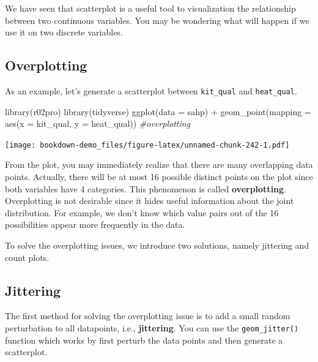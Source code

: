 \documentclass[
]{book}
\newenvironment{Shaded}{\begin{snugshade}}{\end{snugshade}}
\newcommand{\AttributeTok}[1]{\textcolor[rgb]{0.77,0.63,0.00}{#1}}
\newcommand{\CommentTok}[1]{\textcolor[rgb]{0.56,0.35,0.01}{\textit{#1}}}
\newcommand{\FunctionTok}[1]{\textcolor[rgb]{0.00,0.00,0.00}{#1}}
\newcommand{\NormalTok}[1]{#1}
\newcommand{\SpecialCharTok}[1]{\textcolor[rgb]{0.00,0.00,0.00}{#1}}
\begin{document}
We have seen that scatterplot is a useful tool to visualization the relationship between two continuous variables. You may be wondering what will happen if we use it on two discrete variables.

\hypertarget{overplotting}{%
\subsection{Overplotting}\label{overplotting}}

As an example, let's generate a scatterplot between \texttt{kit\_qual} and \texttt{heat\_qual}.

\begin{Shaded}
\begin{Highlighting}[]
\FunctionTok{library}\NormalTok{(r02pro)}
\FunctionTok{library}\NormalTok{(tidyverse)}
\FunctionTok{ggplot}\NormalTok{(}\AttributeTok{data =}\NormalTok{ sahp) }\SpecialCharTok{+} \FunctionTok{geom\_point}\NormalTok{(}\AttributeTok{mapping =} \FunctionTok{aes}\NormalTok{(}\AttributeTok{x =}\NormalTok{ kit\_qual, }\AttributeTok{y =}\NormalTok{ heat\_qual)) }\CommentTok{\#overplotting}
\end{Highlighting}
\end{Shaded}

\texttt{[image: bookdown-demo\_files/figure-latex/unnamed-chunk-242-1.pdf]}

From the plot, you may immediately realize that there are many overlapping data points. Actually, there will be at most 16 possible distinct points on the plot since both variables have 4 categories. This phenomenon is called \textbf{overplotting}. Overplotting is not desirable since it hides useful information about the joint distribution. For example, we don't know which value pairs out of the 16 possibilities appear more frequently in the data.

To solve the overplotting issues, we introduce two solutions, namely jittering and count plots.

\hypertarget{jittering}{%
\subsection{Jittering}\label{jittering}}

The first method for solving the overplotting issue is to add a small random perturbation to all datapoints, i.e., \textbf{jittering}. You can use the \texttt{geom\_jitter()} function which works by first perturb the data points and then generate a scatterplot.
\end{document}
